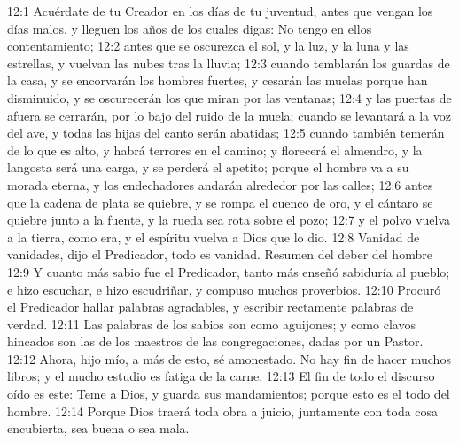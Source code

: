12:1 Acuérdate de tu Creador en los días de tu juventud, antes que vengan los días malos, y lleguen los años de los cuales digas: No tengo en ellos contentamiento;  
12:2 antes que se oscurezca el sol, y la luz, y la luna y las estrellas, y vuelvan las nubes tras la lluvia;  
12:3 cuando temblarán los guardas de la casa, y se encorvarán los hombres fuertes, y cesarán las muelas porque han disminuido, y se oscurecerán los que miran por las ventanas;  
12:4 y las puertas de afuera se cerrarán, por lo bajo del ruido de la muela; cuando se levantará a la voz del ave, y todas las hijas del canto serán abatidas;  
12:5 cuando también temerán de lo que es alto, y habrá terrores en el camino; y florecerá el almendro, y la langosta será una carga, y se perderá el apetito; porque el hombre va a su morada eterna, y los endechadores andarán alrededor por las calles;  
12:6 antes que la cadena de plata se quiebre, y se rompa el cuenco de oro, y el cántaro se quiebre junto a la fuente, y la rueda sea rota sobre el pozo;  
12:7 y el polvo vuelva a la tierra, como era, y el espíritu vuelva a Dios que lo dio.  
12:8 Vanidad de vanidades, dijo el Predicador, todo es vanidad.  
Resumen del deber del hombre  
12:9 Y cuanto más sabio fue el Predicador, tanto más enseñó sabiduría al pueblo; e hizo escuchar, e hizo escudriñar, y compuso muchos proverbios.  
12:10 Procuró el Predicador hallar palabras agradables, y escribir rectamente palabras de verdad.  
12:11 Las palabras de los sabios son como aguijones; y como clavos hincados son las de los maestros de las congregaciones, dadas por un Pastor.  
12:12 Ahora, hijo mío, a más de esto, sé amonestado. No hay fin de hacer muchos libros; y el mucho estudio es fatiga de la carne.  
12:13 El fin de todo el discurso oído es este: Teme a Dios, y guarda sus mandamientos; porque esto es el todo del hombre.  
12:14 Porque Dios traerá toda obra a juicio, juntamente con toda cosa encubierta, sea buena o sea mala.

